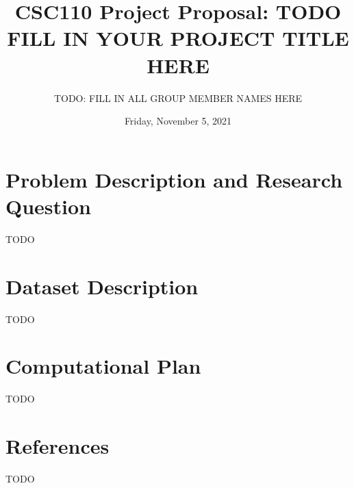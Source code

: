 \documentclass[fontsize=11pt]{article}
\title{CSC110 Project Proposal: TODO FILL IN YOUR PROJECT TITLE HERE}
\author{TODO: FILL IN ALL GROUP MEMBER NAMES HERE}
\date{Friday, November 5, 2021}
\begin{document}
\maketitle

\section*{Problem Description and Research Question}

TODO

\section*{Dataset Description}

TODO

\section*{Computational Plan}

TODO

\section*{References}

TODO

\end{document}

